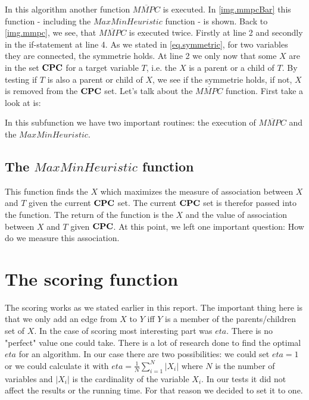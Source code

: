			In this algorithm another function $\overline{MMPC}$ is executed. In \autoref{img.mmpcBar} this function - including the $MaxMinHeuristic$ function - is shown. Back to \autoref{img.mmpc}, we see, that $\overline{MMPC}$ is executed twice. Firstly at line 2 and secondly in the if-statement at line 4. As we stated in \autoref{eq.symmetric}, for two variables they are connected, the symmetrie holds. At line 2 we only now that some $X$ are in the set ${\textbf{CPC}}$ for a target variable $T$, i.e. the $X$ is a parent or a child of $T$. By testing if $T$ is also a parent or child of $X$, we see if the symmetrie holds, if not, $X$ is removed from the ${\textbf{CPC}}$ set. Let's talk about the $\overline{MMPC}$ function. First take a look at is:

			 \label{img.mmpcBar}

			In this subfunction we have two important routines: the execution of $\overline{MMPC}$ and the $MaxMinHeuristic$.

			\subsection{The $MaxMinHeuristic$ function}

				This function finds the $X$ which maximizes the measure of association between $X$ and $T$ given the current ${\textbf{CPC}}$ set. The current ${\textbf{CPC}}$ set is therefor passed into the function. The return of the function is the $X$ and the value of association between $X$ and $T$ given ${\textbf{CPC}}$. At this point, we left one important question: How do we measure this association.

		\section{The scoring function}

			The scoring works as we stated earlier in this report. The important thing here is that we only add an edge from $X$ to $Y$ iff $Y$ is a member of the parents/children set of $X$. In the case of scoring most interesting part was $eta$. There is no "perfect" value one could take. There is a lot of research done to find the optimal $eta$ for an algorithm. In our case there are two possibilities: we could set $eta = 1$ or we could calculate it with $eta = \frac{1}{N} \sum_{i = 1}^{N} |X_{i}|$ where $N$ is the number of variables and $|X_{i}|$ is the cardinality of the variable $X_{i}$. In our tests it did not affect the results or the running time. For that reason we decided to set it to one.

